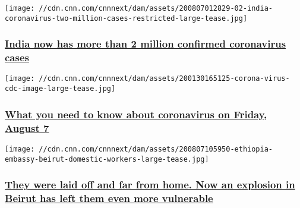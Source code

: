 \href{/2020/08/07/asia/india-coronavirus-two-million-intl-hnk/index.html}{}

\texttt{[image: //cdn.cnn.com/cnnnext/dam/assets/200807012829-02-india-coronavirus-two-million-cases-restricted-large-tease.jpg]}

\hypertarget{india-now-has-more-than-2-million-confirmed-coronavirus-cases}{%
\subsubsection{\texorpdfstring{\href{/2020/08/07/asia/india-coronavirus-two-million-intl-hnk/index.html}{India
now has more than 2 million confirmed coronavirus
cases}}{India now has more than 2 million confirmed coronavirus cases}}\label{india-now-has-more-than-2-million-confirmed-coronavirus-cases}}

\href{/2020/08/07/world/coronavirus-newsletter-08-07-20-intl/index.html}{}

\texttt{[image: //cdn.cnn.com/cnnnext/dam/assets/200130165125-corona-virus-cdc-image-large-tease.jpg]}

\hypertarget{what-you-need-to-know-about-coronavirus-on-friday-august-7}{%
\subsubsection{\texorpdfstring{\href{/2020/08/07/world/coronavirus-newsletter-08-07-20-intl/index.html}{What
you need to know about coronavirus on Friday, August
7}}{What you need to know about coronavirus on Friday, August 7}}\label{what-you-need-to-know-about-coronavirus-on-friday-august-7}}

\href{/2020/08/07/africa/beirut-domestic-workers-ethiopia-intl/index.html}{}

\texttt{[image: //cdn.cnn.com/cnnnext/dam/assets/200807105950-ethiopia-embassy-beirut-domestic-workers-large-tease.jpg]}

\hypertarget{they-were-laid-off-and-far-from-home-now-an-explosion-in-beirut-has-left-them-even-more-vulnerable-1}{%
\subsubsection{\texorpdfstring{\href{/2020/08/07/africa/beirut-domestic-workers-ethiopia-intl/index.html}{They
were laid off and far from home. Now an explosion in Beirut has left
them even more
vulnerable}}{They were laid off and far from home. Now an explosion in Beirut has left them even more vulnerable}}\label{they-were-laid-off-and-far-from-home-now-an-explosion-in-beirut-has-left-them-even-more-vulnerable-1}}

